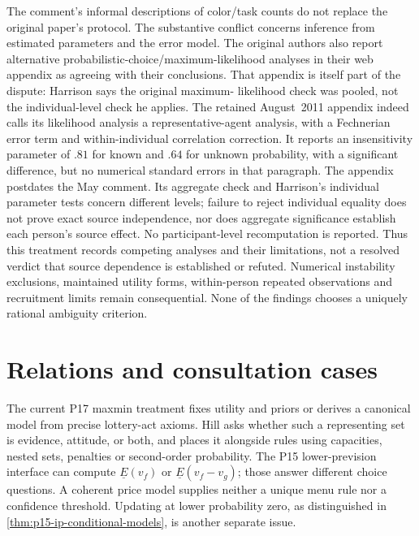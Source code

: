 The comment's informal descriptions of color/task counts do not replace
the original paper's protocol. The substantive conflict concerns inference
from estimated parameters and the error model. The original authors
also report alternative probabilistic-choice/maximum-likelihood analyses
in their web appendix as agreeing with their conclusions. That appendix
is itself part of the dispute: Harrison says the original maximum-
likelihood check was pooled, not the individual-level check he applies.
\cite[pp.~704--705]{AbdellaouiEtAl2011Sources}
\cite[p.~9]{Harrison2011SourcesComment}
The retained August~2011 appendix indeed calls its likelihood analysis
a representative-agent analysis, with a Fechnerian error term and
within-individual correlation correction. It reports an insensitivity
parameter of \(.81\) for known and \(.64\) for unknown probability,
with a significant difference, but no numerical standard errors in
that paragraph. The appendix postdates the May comment. Its aggregate
check and Harrison's individual parameter tests concern different
levels; failure to reject individual equality does not prove exact
source independence, nor does aggregate significance establish each
person's source effect. No participant-level recomputation is reported.
\cite[Sec.~A.5, p.~12]{AbdellaouiEtAl2011SourcesAppendix}
Thus this treatment records competing analyses and their
limitations, not a resolved verdict that source dependence is established
or refuted. Numerical instability exclusions, maintained utility forms,
within-person repeated observations and recruitment limits remain
consequential. None of the findings chooses a uniquely rational ambiguity
criterion.

\section{Relations and consultation cases}
\label{sec:p17-rat84-consultation}

The current P17 maxmin treatment fixes utility and priors or derives a
canonical model from precise lottery-act axioms. Hill asks whether such
a representing set is evidence, attitude, or both, and places it alongside
rules using capacities, nested sets, penalties or second-order probability.
The P15 lower-prevision interface can compute \(\underline E(v_f)\)
or \(\underline E(v_f-v_g)\); those answer different choice questions.
A coherent price model supplies neither a unique menu rule nor a
confidence threshold. Updating at lower probability zero, as distinguished
in \cref{thm:p15-ip-conditional-models}, is another separate issue.

